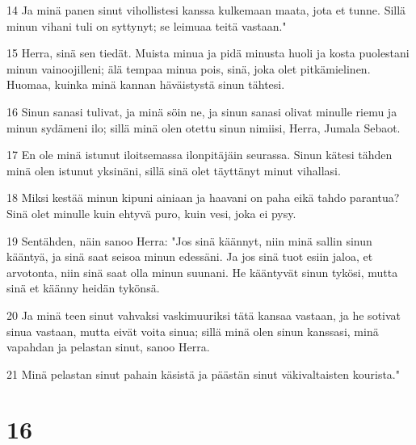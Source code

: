 \par 14 Ja minä panen sinut vihollistesi kanssa kulkemaan maata, jota et tunne. Sillä minun vihani tuli on syttynyt; se leimuaa teitä vastaan."
\par 15 Herra, sinä sen tiedät. Muista minua ja pidä minusta huoli ja kosta puolestani minun vainoojilleni; älä tempaa minua pois, sinä, joka olet pitkämielinen. Huomaa, kuinka minä kannan häväistystä sinun tähtesi.
\par 16 Sinun sanasi tulivat, ja minä söin ne, ja sinun sanasi olivat minulle riemu ja minun sydämeni ilo; sillä minä olen otettu sinun nimiisi, Herra, Jumala Sebaot.
\par 17 En ole minä istunut iloitsemassa ilonpitäjäin seurassa. Sinun kätesi tähden minä olen istunut yksinäni, sillä sinä olet täyttänyt minut vihallasi.
\par 18 Miksi kestää minun kipuni ainiaan ja haavani on paha eikä tahdo parantua? Sinä olet minulle kuin ehtyvä puro, kuin vesi, joka ei pysy.
\par 19 Sentähden, näin sanoo Herra: "Jos sinä käännyt, niin minä sallin sinun kääntyä, ja sinä saat seisoa minun edessäni. Ja jos sinä tuot esiin jaloa, et arvotonta, niin sinä saat olla minun suunani. He kääntyvät sinun tykösi, mutta sinä et käänny heidän tykönsä.
\par 20 Ja minä teen sinut vahvaksi vaskimuuriksi tätä kansaa vastaan, ja he sotivat sinua vastaan, mutta eivät voita sinua; sillä minä olen sinun kanssasi, minä vapahdan ja pelastan sinut, sanoo Herra.
\par 21 Minä pelastan sinut pahain käsistä ja päästän sinut väkivaltaisten kourista."

\chapter{16}


